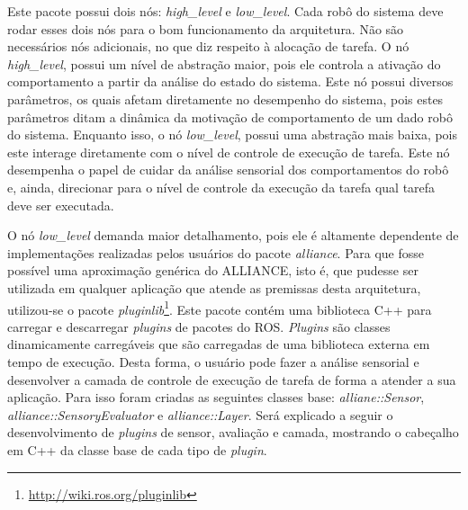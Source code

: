         Este pacote possui dois nós: \textit{high\_level} e \textit{low\_level}. Cada robô do sistema deve rodar esses dois nós para o bom funcionamento da arquitetura. Não são necessários nós adicionais, no que diz respeito à alocação de tarefa. O nó \textit{high\_level}, possui um nível de abstração maior, pois ele controla a ativação do comportamento a partir da análise do estado do sistema. Este nó possui diversos parâmetros, os quais afetam diretamente no desempenho do sistema, pois estes parâmetros ditam a dinâmica da motivação de comportamento de um dado robô do sistema. Enquanto isso, o nó \textit{low\_level}, possui uma abstração mais baixa, pois este interage diretamente com o nível de controle de execução de tarefa. Este nó desempenha o papel de cuidar da análise sensorial dos comportamentos do robô e, ainda, direcionar para o nível de controle da execução da tarefa qual tarefa deve ser executada.
        
        O nó \textit{low\_level} demanda maior detalhamento, pois ele é altamente dependente de implementações realizadas pelos usuários do pacote \textit{alliance}. Para que fosse possível uma aproximação genérica do ALLIANCE, isto é, que pudesse ser utilizada em qualquer aplicação que atende as premissas desta arquitetura, utilizou-se o pacote \textit{pluginlib}\footnote{\url{http://wiki.ros.org/pluginlib}}. Este pacote contém uma biblioteca C++ para carregar e descarregar \textit{plugins} de pacotes do ROS. \textit{Plugins} são classes dinamicamente carregáveis que são carregadas de uma biblioteca externa em tempo de execução. Desta forma, o usuário pode fazer a análise sensorial e desenvolver a camada de controle de execução de tarefa de forma a atender a sua aplicação. Para isso foram criadas as seguintes classes base: \textit{alliane::Sensor}, \textit{alliance::SensoryEvaluator} e \textit{alliance::Layer}. Será explicado a seguir o desenvolvimento de \textit{plugins} de sensor, avaliação e camada, mostrando o cabeçalho em C++ da classe base de cada tipo de \textit{plugin}.
        
        
